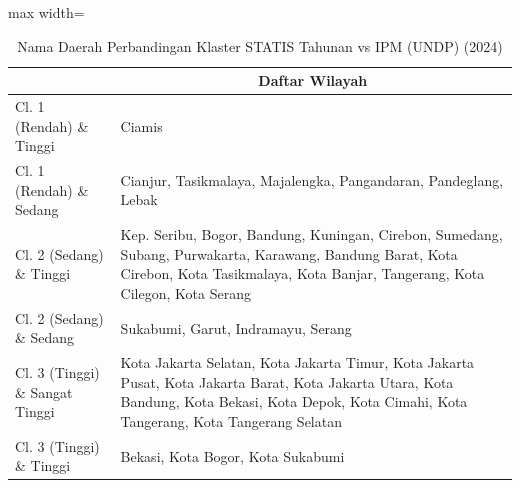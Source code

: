 \begin{table}[H]
\centering
\caption{Nama Daerah Perbandingan Klaster STATIS Tahunan vs IPM (UNDP) (2024)} \label{tab:app2statis_ipm_name_2024}
\begin{adjustbox}{max width=\textwidth}
\begin{tabular}{|>{\centering\arraybackslash}p{4cm}|p{10cm}|}
\hline
\multicolumn{1}{|c|}{\textbf{Kategori}} & \multicolumn{1}{c|}{\textbf{Daftar Wilayah}} \\
\hline
Cl. 1 (Rendah) \& Tinggi & Ciamis \\
\hline
Cl. 1 (Rendah) \& Sedang & Cianjur, Tasikmalaya, Majalengka, Pangandaran, Pandeglang, Lebak \\
\hline
Cl. 2 (Sedang) \& Tinggi & Kep. Seribu, Bogor, Bandung, Kuningan, Cirebon, Sumedang, Subang, Purwakarta, Karawang, Bandung Barat, Kota Cirebon, Kota Tasikmalaya, Kota Banjar, Tangerang, Kota Cilegon, Kota Serang \\
\hline
Cl. 2 (Sedang) \& Sedang & Sukabumi, Garut, Indramayu, Serang \\
\hline
Cl. 3 (Tinggi) \& Sangat Tinggi & Kota Jakarta Selatan, Kota Jakarta Timur, Kota Jakarta Pusat, Kota Jakarta Barat, Kota Jakarta Utara, Kota Bandung, Kota Bekasi, Kota Depok, Kota Cimahi, Kota Tangerang, Kota Tangerang Selatan \\
\hline
Cl. 3 (Tinggi) \& Tinggi & Bekasi, Kota Bogor, Kota Sukabumi \\
\hline
\end{tabular}
\end{adjustbox}
\end{table}